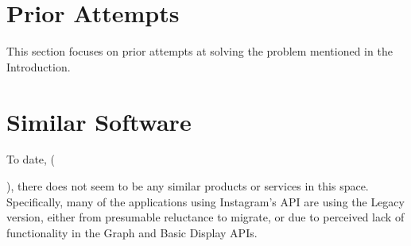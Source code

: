 \section{Prior Attempts}
This section focuses on prior attempts at solving the problem mentioned in the Introduction. 

\section{Similar Software}
To date, (\date{\today}), there does not seem to be any similar products or services in this space.
Specifically, many of the applications using Instagram's API are using the Legacy version, either from presumable reluctance
to migrate, or due to perceived lack of functionality in the Graph and Basic Display APIs.